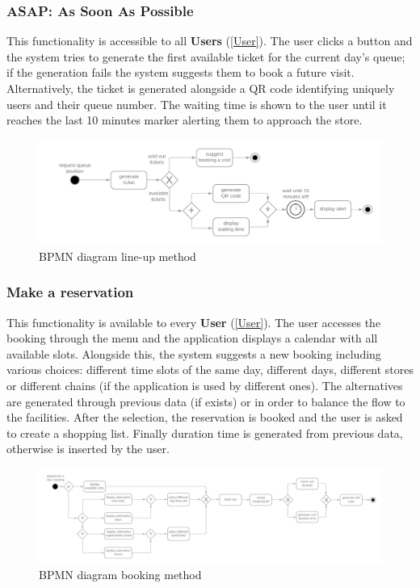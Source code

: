 \documentclass[table, 12pt]{article}
\begin{document}
\subsubsection{ASAP: As Soon As Possible}
\label{line_up}
This functionality is accessible to all \textbf{Users} (\ref{User}). The user clicks a button and the system tries to generate the first available ticket for the current day's queue; if the generation fails the system suggests them to book a future visit.
Alternatively, the ticket is generated alongside a QR code identifying uniquely users and their queue number. The waiting time is shown to the user until it reaches the last 10 minutes marker alerting them to approach the store.
\begin{figure}[H]
    \begin{center}
        \includegraphics[scale=0.25]{assets/Functions/function-line-up.png}
        \caption{BPMN diagram line-up method}
    \end{center}
\end{figure}

\subsubsection{Make a reservation}
\label{book_a_visit}
This functionality is available to every \textbf{User} (\ref{User}). The user accesses the booking through the menu and the application displays a calendar with all available slots. Alongside this, the system suggests a new booking including various choices: different time slots of the same day, different days, different stores or different chains (if the application is used by different ones). The alternatives are generated through previous data (if exists) or in order to balance the flow to the facilities. After the selection, the reservation is booked and the user is asked to create a shopping list. Finally duration time is generated from previous data, otherwise is inserted by the user.
\begin{figure}[H]
    \begin{center}
        \includegraphics[scale=0.15]{assets/Functions/function-book-a-visit.png}
        \caption{BPMN diagram booking method}
    \end{center}
\end{figure}
\end{document}
